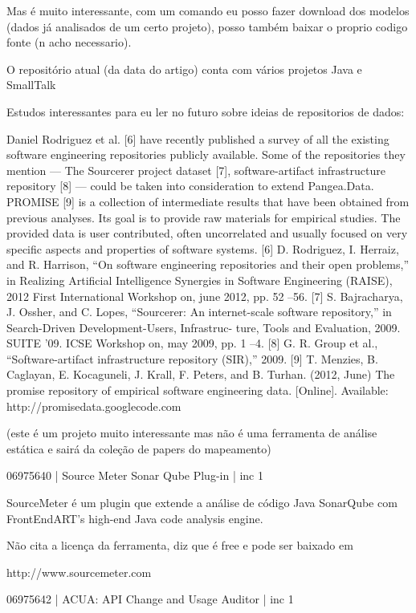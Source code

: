 \documentclass[12pt]{article}
\begin{document}
Mas é muito interessante, com um comando eu posso fazer download dos modelos
(dados já analisados de um certo projeto), posso também baixar o proprio
codigo fonte (n acho necessario).

O repositório atual (da data do artigo) conta com vários projetos Java e
SmallTalk

Estudos interessantes para eu ler no futuro sobre ideias de repositorios de
dados:

Daniel Rodriguez et al. [6] have recently published a survey
of all the existing software engineering repositories publicly
available. Some of the repositories they mention — The
Sourcerer project dataset [7], software-artifact infrastructure
repository [8] — could be taken into consideration to extend
Pangea.Data.
PROMISE [9] is a collection of intermediate results that
have been obtained from previous analyses. Its goal is to
provide raw materials for empirical studies. The provided data
is user contributed, often uncorrelated and usually focused on
very specific aspects and properties of software systems.
[6] D. Rodriguez, I. Herraiz, and R. Harrison, “On software engineering
repositories and their open problems,” in Realizing Artificial Intelligence
Synergies in Software Engineering (RAISE), 2012 First International
Workshop on, june 2012, pp. 52 –56.
[7] S. Bajracharya, J. Ossher, and C. Lopes, “Sourcerer: An internet-scale
software repository,” in Search-Driven Development-Users, Infrastruc-
ture, Tools and Evaluation, 2009. SUITE ’09. ICSE Workshop on, may
2009, pp. 1 –4.
[8] G. R. Group et al., “Software-artifact infrastructure repository (SIR),”
2009.
[9] T. Menzies, B. Caglayan, E. Kocaguneli, J. Krall, F. Peters, and
B. Turhan. (2012, June) The promise repository of empirical software
engineering data. [Online]. Available: http://promisedata.googlecode.com

(este é um projeto muito interessante mas não é uma ferramenta de análise
estática e sairá da coleção de papers do mapeamento)

06975640 | Source Meter Sonar Qube Plug-in | inc 1

SourceMeter é um plugin que extende a análise de código Java SonarQube com
FrontEndART’s high-end Java code analysis engine.

Não cita a licença da ferramenta, diz que é free e pode ser baixado em

http://www.sourcemeter.com



06975642 | ACUA: API Change and Usage Auditor | inc 1
\end{document}
